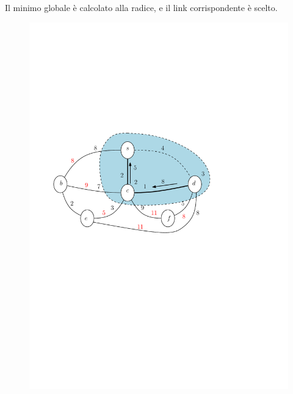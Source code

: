 \documentclass[10pt,xcolor=dvipsnames]{beamer}
\begin{document}
\begin{frame}
	\frametitle{}
	Il minimo globale è calcolato alla radice, e il link corrispondente
	è scelto.
	\begin{figure}[h]
	\centering
		\includegraphics[scale=0.6]{PT3.pdf}
	\end{figure}
\end{frame}
\end{document}

